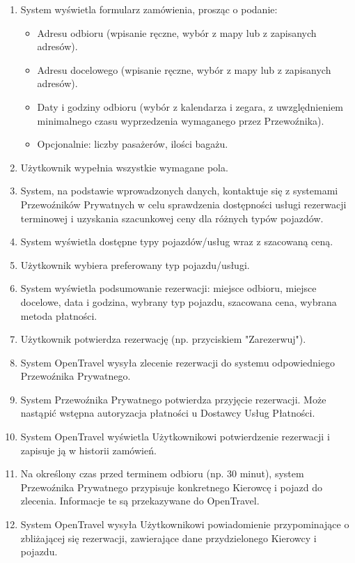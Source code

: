 \documentclass[a4paper,12pt]{article}
\begin{document}
\begin{itemize}
\begin{enumerate}
            \item System wyświetla formularz zamówienia, prosząc o podanie:
                \begin{itemize}
                    \item Adresu odbioru (wpisanie ręczne, wybór z mapy lub z zapisanych adresów).
                    \item Adresu docelowego (wpisanie ręczne, wybór z mapy lub z zapisanych adresów).
                    \item Daty i godziny odbioru (wybór z kalendarza i zegara, z uwzględnieniem minimalnego czasu wyprzedzenia wymaganego przez Przewoźnika).
                    \item Opcjonalnie: liczby pasażerów, ilości bagażu.
                \end{itemize}
            \item Użytkownik wypełnia wszystkie wymagane pola.
            \item System, na podstawie wprowadzonych danych, kontaktuje się z systemami Przewoźników Prywatnych w celu sprawdzenia dostępności usługi rezerwacji terminowej i uzyskania szacunkowej ceny dla różnych typów pojazdów.
            \item System wyświetla dostępne typy pojazdów/usług wraz z szacowaną ceną.
            \item Użytkownik wybiera preferowany typ pojazdu/usługi.
            \item System wyświetla podsumowanie rezerwacji: miejsce odbioru, miejsce docelowe, data i godzina, wybrany typ pojazdu, szacowana cena, wybrana metoda płatności.
            \item Użytkownik potwierdza rezerwację (np. przyciskiem "Zarezerwuj").
            \item System OpenTravel wysyła zlecenie rezerwacji do systemu odpowiedniego Przewoźnika Prywatnego.
            \item System Przewoźnika Prywatnego potwierdza przyjęcie rezerwacji. Może nastąpić wstępna autoryzacja płatności u Dostawcy Usług Płatności.
            \item System OpenTravel wyświetla Użytkownikowi potwierdzenie rezerwacji i zapisuje ją w historii zamówień.
            \item Na określony czas przed terminem odbioru (np. 30 minut), system Przewoźnika Prywatnego przypisuje konkretnego Kierowcę i pojazd do zlecenia. Informacje te są przekazywane do OpenTravel.
            \item System OpenTravel wysyła Użytkownikowi powiadomienie przypominające o zbliżającej się rezerwacji, zawierające dane przydzielonego Kierowcy i pojazdu.

\end{enumerate}
\end{itemize}
\end{document}
